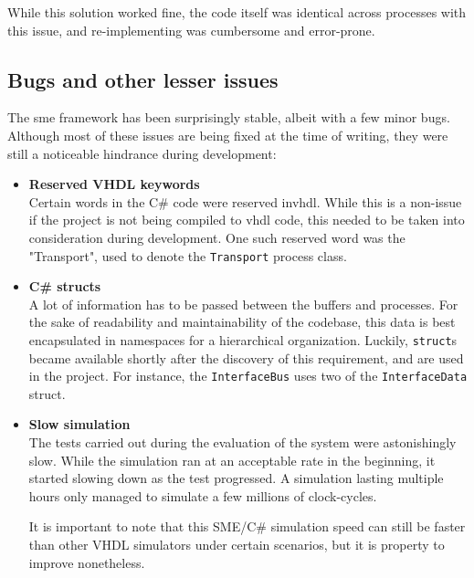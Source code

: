 While this solution worked fine, the code itself was identical across processes
with this issue, and re-implementing was cumbersome and error-prone.

\subsection{Bugs and other lesser issues}
The \gls{sme} framework has been surprisingly stable, albeit with a few minor
bugs. Although most of these issues are being fixed at the time of writing,
they were still a noticeable hindrance during development:
\begin{itemize}
\item \textbf{Reserved VHDL keywords}\\
Certain words in the C\# code were reserved in\gls{vhdl}. While this is a
non-issue if the project is not being compiled to \gls{vhdl} code, this needed
to be taken into consideration during development. One such reserved word  was
the "Transport", used to denote the \texttt{Transport} process class.

\item \textbf{C\# structs}\\
A lot of information has to be passed between the buffers and processes. For
the sake of readability and maintainability of the codebase, this data is best
encapsulated in namespaces for a hierarchical organization.
Luckily, \texttt{struct}s became available shortly after the discovery of this
requirement, and are used in the project. For instance, the
\texttt{InterfaceBus} uses two of the \texttt{InterfaceData} struct.

\item \textbf{Slow simulation}\\
The tests carried out during the evaluation of the system were astonishingly
slow. While the simulation ran at an acceptable rate in the beginning, it
started slowing down as the test progressed. A simulation lasting multiple
hours only managed to simulate a few millions of clock-cycles.

It is important to note that this SME/C\# simulation speed can still be faster
than other VHDL simulators under certain scenarios, but it is property to
improve nonetheless.


\end{itemize}


